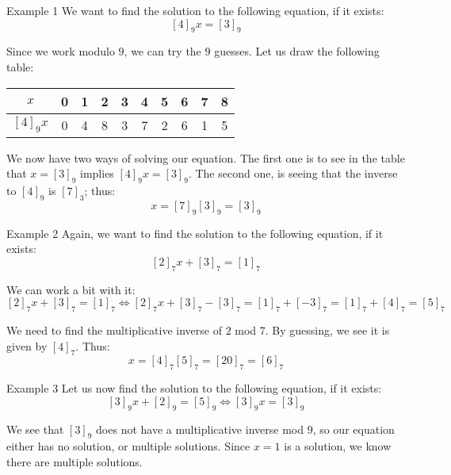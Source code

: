 \documentclass[a4paper]{article}
\begin{document}
\begin{parag}{Example 1}
    We want to find the solution to the following equation, if it exists: 
    \[\left[4\right]_9 x = \left[3\right]_9\]
    
    Since we work modulo $9$, we can try the $9$ guesses. Let us draw the following table:
    \begin{center}
    \begin{tabular}{c|ccccccccc}
        $x$ & 0 & 1 & 2 & 3 & 4 & 5 & 6 & 7 & 8 \\
        \hline
        $\left[4\right]_9 x$ & 0 & 4 & 8 & 3 & 7 & 2 & 6 & 1 & 5
    \end{tabular}
    \end{center}
    
    We now have two ways of solving our equation. The first one is to see in the table that $x = \left[3\right]_9$ implies $\left[4\right]_9 x = \left[3\right]_9$. The second one, is seeing that the inverse to $\left[4\right]_9$ is $\left[7\right]_3$; thus: 
    \[x = \left[7\right]_9 \left[3\right]_9 = \left[3\right]_9\]
\end{parag}

\begin{parag}{Example 2}
    Again, we want to find the solution to the following equation, if it exists: 
    \[\left[2\right]_7 x + \left[3\right]_7 = \left[1\right]_7 \]
    
    We can work a bit with it: 
    \[\left[2\right]_7 x + \left[3\right]_7 = \left[1\right]_7 \iff \left[2\right]_7 x + \left[3\right]_7 - \left[3\right]_7 = \left[1\right]_7 + \left[-3\right]_7 = \left[1\right]_7 + \left[4\right]_7 = \left[5\right]_7\]

    We need to find the multiplicative inverse of $2$ mod 7. By guessing, we see it is given by $\left[4\right]_7$. Thus: 
    \[x = \left[4\right]_7 \left[5\right]_7 = \left[20\right]_7 = \left[6\right]_7\]
\end{parag}

\begin{parag}{Example 3}
    Let us now find the solution to the following equation, if it exists: 
    \[\left[3\right]_9 x + \left[2\right]_9 = \left[5\right]_9 \iff \left[3\right]_9 x = \left[3\right]_9\]
    
    We see that $\left[3\right]_9$ does not have a multiplicative inverse mod $9$, so our equation either has no solution, or multiple solutions. Since $x = 1$ is a solution, we know there are multiple solutions.
\end{parag}
\end{document}
